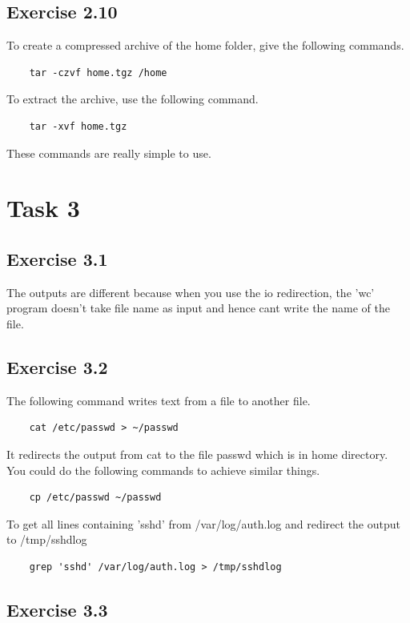 \documentclass{article}
\begin{document}
\subsection{Exercise 2.10}
To create a compressed archive of the home folder, give the following commands.
\begin{verbatim}
	tar -czvf home.tgz /home
\end{verbatim}
To extract the archive, use the following command.
\begin{verbatim}
	tar -xvf home.tgz
\end{verbatim}
These commands are really simple to use.

\section{Task 3}
\subsection{Exercise 3.1}
The outputs are different because when you use the io redirection,
the 'wc' program doesn't take file name as input and hence cant write the name of the file.

\subsection{Exercise 3.2}
The following command writes text from a file to another file.
\begin{verbatim}
	cat /etc/passwd > ~/passwd
\end{verbatim}
It redirects the output from cat to the file passwd which is in home directory.
You could do the following commands to achieve similar things.
\begin{verbatim}
	cp /etc/passwd ~/passwd
\end{verbatim}
To get all lines containing 'sshd' from /var/log/auth.log and 
redirect the output to /tmp/sshdlog
\begin{verbatim}
	grep 'sshd' /var/log/auth.log > /tmp/sshdlog
\end{verbatim}

\subsection{Exercise 3.3}
\end{document}
